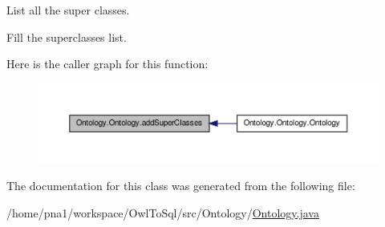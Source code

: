 List all the super classes. 

Fill the superclasses list. 

Here is the caller graph for this function:\nopagebreak
\begin{figure}[H]
\begin{center}
\leavevmode
\includegraphics[width=400pt]{class_ontology_1_1_ontology_a7028d98e45511b5dbab527e311dd24a6_icgraph}
\end{center}
\end{figure}




The documentation for this class was generated from the following file:\begin{DoxyCompactItemize}
\item 
/home/pna1/workspace/OwlToSql/src/Ontology/\hyperlink{_ontology_8java}{Ontology.java}\end{DoxyCompactItemize}
